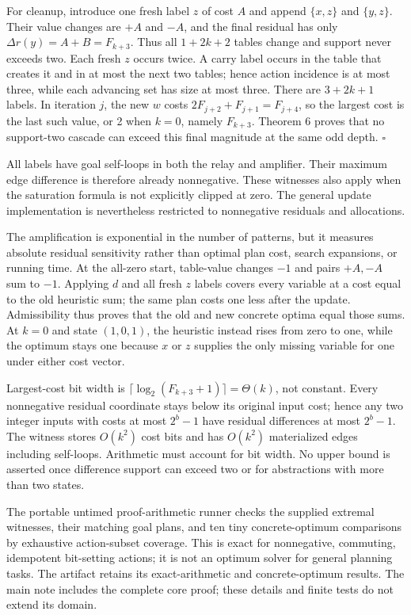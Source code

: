 For cleanup, introduce one fresh label $z$ of cost $A$ and append $\{x,z\}$ and $\{y,z\}$. Their value changes are $+A$ and $-A$, and the final residual has only $\Delta r(y)=A+B=F_{k+3}$. Thus all $1+2k+2$ tables change and support never exceeds two. Each fresh $z$ occurs twice. A carry label occurs in the table that creates it and in at most the next two tables; hence action incidence is at most three, while each advancing set has size at most three. There are $3+2k+1$ labels. In iteration $j$, the new $w$ costs $2F_{j+2}+F_{j+1}=F_{j+4}$, so the largest cost is the last such value, or 2 when $k=0$, namely $F_{k+3}$. Theorem 6 proves that no support-two cascade can exceed this final magnitude at the same odd depth. $\square$

All labels have goal self-loops in both the relay and amplifier. Their maximum edge difference is therefore already nonnegative. These witnesses also apply when the saturation formula is not explicitly clipped at zero. The general update implementation is nevertheless restricted to nonnegative residuals and allocations.

The amplification is exponential in the number of patterns, but it measures
absolute residual sensitivity rather than optimal plan cost, search expansions,
or running time. At the all-zero start, table-value changes $-1$ and pairs
$+A,-A$ sum to $-1$. Applying $d$ and all fresh $z$ labels covers every
variable at a cost equal to the old heuristic sum; the same plan costs one
less after the update. Admissibility thus proves that the old and new
concrete optima equal those sums. At $k=0$ and state $(1,0,1)$, the
heuristic instead rises from zero to one, while the optimum stays one because
$x$ or $z$ supplies the only missing variable for one under either cost vector.

Largest-cost bit width is $\lceil\log_2(F_{k+3}+1)\rceil=\Theta(k)$,
not constant. Every nonnegative residual coordinate stays below its original
input cost; hence any two integer inputs with costs at most $2^b-1$ have
residual differences at most $2^b-1$. The witness stores $O(k^2)$ cost bits
and has $O(k^2)$ materialized edges including self-loops. Arithmetic must
account for bit width. No upper bound is asserted once difference support
can exceed two or for abstractions with more than two states.

The portable untimed proof-arithmetic runner
checks the supplied extremal witnesses, their matching goal plans, and ten
tiny concrete-optimum comparisons by exhaustive action-subset coverage.
This is exact for nonnegative, commuting, idempotent bit-setting actions;
it is not an optimum solver for general planning tasks. The artifact retains
its exact-arithmetic and concrete-optimum results. The main note includes the complete
core proof; these details and finite tests do not extend its domain.

